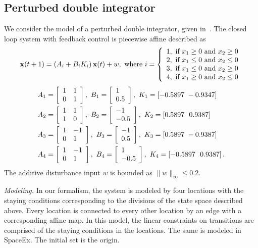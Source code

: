 \subsection{Perturbed double integrator}
We consider the model of a perturbed double integrator, given
in~\cite{TODO}.  The closed loop system with feedback control is piecewise affine described as
\[{\bf x}(t+1)=\left(A_i+B_iK_i\right){\bf x}(t)+w,~\text{where}~
i=\left\{\begin{array}{l}
1,~\text{if}~x_1\geq 0~\text{and}~x_2\geq 0\\
2,~\text{if}~x_1\leq 0~\text{and}~x_2\leq 0\\
3,~\text{if}~x_1\leq 0~\text{and}~x_2\geq 0\\
4,~\text{if}~x_1\geq 0~\text{and}~x_2\leq 0\\
\end{array} \right.\]
%
\begin{align*}
& A_1 =\left[\begin{array}{ll}
1 & 1\\
0 & 1
\end{array}\right],~B_1 = \left[\begin{array}{l}{1}\\{0.5} \end{array}\right],~K_1 = \left[-0.5897~
  -0.9347\right]\\
& A_2 = \left[\begin{array}{ll}
1 & 1\\
1 & 0
\end{array}
\right],~B_2 = \left[\begin{array}{l}{-1}\\{-0.5} \end{array}\right],~K_2 = \left[0.5897~~0.9387\right]\\
& A_3 = \left[\begin{array}{ll}
1 & -1\\
0 & 1
\end{array}
\right],~B_3 = \left[\begin{array}{l}{-1}\\{0.5} \end{array}\right],~K_3 = \left[0.5897~-0.9387\right]\\
& A_4 = \left[\begin{array}{ll}
1 & -1\\
0 & 1
\end{array}
\right],~B_4 = \left[\begin{array}{l}{1}\\{-0.5} \end{array}\right],~K_4 = \left[-0.5897~~0.9387\right].\\
\end{align*}
%  
The additive disturbance input $w$ is bounded as $\|w\|_{\infty}\leq
0.2$.  

\emph{Modeling.}  In our formalism, the system is modeled by four
locations with the staying conditions corresponding to the divisions
of the state space described above.  Every location is connected to
every other location by an edge with a corresponding affine map.  In
this model, the linear constraints on transitions are comprised of the
staying conditions in the locations.  The same is modeled in SpaceEx.
The initial set is the origin.


